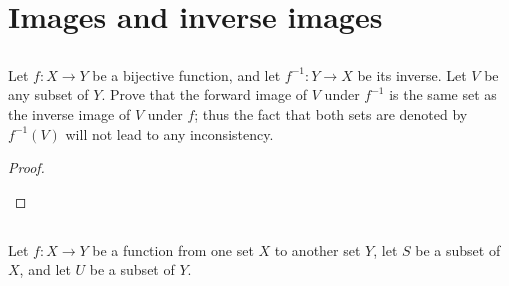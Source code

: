 \documentclass[../../main.tex]{subfiles}
\begin{document}
\ifmainfile
\else
    \maketitle
    \addtocounter{chapter}{3}
    \addtocounter{section}{3}
    \section{Images and inverse images}
\fi

\subsection{}
\begin{q}
    Let $f \colon X \to Y$ be a bijective function, and let $f^{-1} \colon Y \to X$ be its inverse. Let $V$ be any subset of $Y$. Prove that the forward image of $V$ under $f^{-1}$ is the same set as the inverse image of $V$ under $f$; thus the fact that both sets are denoted by $f^{-1}(V)$ will not lead to any inconsistency.
\end{q}

\begin{ans}
    
\end{ans}
    
\begin{proof}
    \begin{xx}
        
    \end{xx}
\end{proof}

\subsection{}
\begin{q}
    Let $f \colon X \to Y$ be a function from one set $X$ to another set $Y$, let $S$ be a subset of $X$, and let $U$ be a subset of $Y$.
\end{q}
\end{document}
